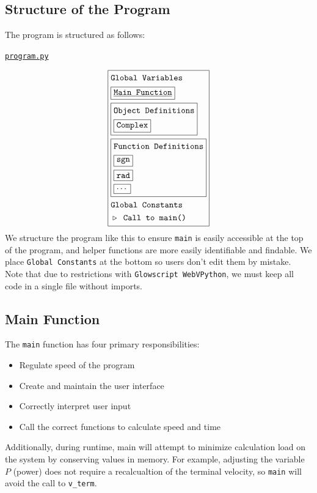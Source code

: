 \documentclass[twocolumn]{article}
\newcommand{\en}{\vspace{0.25cm}\\}
\newcommand{\centerit}[1]{{\begin{center} #1 \end{center}}}
\newcommand{\ul}[1]{\underline{#1}}
\begin{document}
\subsection{Structure of the Program}
The program is structured as follows:
\centerit{\texttt{\ul{program.py}}}
\[
\boxed{
\begin{aligned}
    &\texttt{Global Variables}\\
    &\boxed{\texttt{\ul{Main Function}}}\\
    &\boxed{\begin{aligned}
        &\texttt{Object Definitions}\\
        &\boxed{\texttt{Complex}}
    \end{aligned}}\\
    &\boxed{\begin{aligned}
        &\texttt{Function Definitions}\\
        &\boxed{\texttt{sgn}}\\
        &\boxed{\texttt{rad}}\\
        &\boxed{\cdots}
    \end{aligned}}\\
    &\texttt{Global Constants}\\
    &\triangleright\texttt{ Call to main()}
\end{aligned}
}\]
We structure the program like this to ensure \texttt{main} is easily accessible at the top of the program, and helper functions are more easily identifiable and findable. We place \texttt{Global Constants} at the bottom so users don't edit them by mistake.\en
Note that due to restrictions with \texttt{Glowscript WebVPython}, we must keep all code in a single file without imports. 
\subsection{Main Function}
The \texttt{main} function has four primary responsibilities:
\begin{itemize}[parsep=0pt, itemsep=0pt]
    \item Regulate speed of the program
    \item Create and maintain the user interface
    \item Correctly interpret user input
    \item Call the correct functions to calculate speed and time
\end{itemize}
Additionally, during runtime, main will attempt to minimize calculation load on the system by conserving values in memory. For example, adjusting the variable $P$ (power) does not require a recalcualtion of the terminal velocity, so \texttt{main} will avoid the call to \texttt{v\_term}. 
\end{document}
